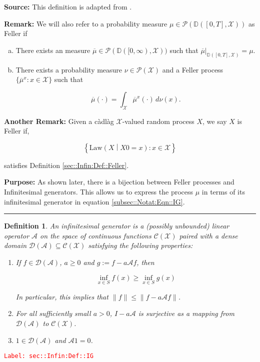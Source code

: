 \documentclass[12pt]{article}
\newcommand{\mb}{\mathbb}
\newcommand{\mc}{\mathcal}
\newcommand{\ov}{\overline}
\newcommand{\te}{\text}
\newcommand{\tr}{\textcolor{red}}
\newcommand{\labe}[1]{\tr{\texttt{Label: #1}}}
\newcommand{\purpose}{\textbf{Purpose: }}
\newcommand{\lin}{\rule{\linewidth}{0.4 pt}}
\newcommand{\cad}{\mb{D}}							%
\newcommand{\x}{x}								%
\newcommand{\X}{X}								%
\newcommand{\IG}{\mc{A}}						%
\newcommand{\law}{\te{Law}}						%
\newtheorem{defn}[thms]{Definition}
\begin{document}
\textbf{Source: } This definition is adapted from \cite[Definition 1.1,1.2]{Lig85}.

\textbf{Remark: } We will also refer to a probability measure \(\mu \in \mc{P}(\cad([0,T],\mc{X}))\) as Feller if

\begin{enumerate}[(a)]
\item There exists an measure \(\ov{\mu}\in \mc{P}(\cad([0,\infty),\mc{X}))\) such that \(\ov{\mu}|_{\cad([0,T],\mc{X})} = \mu\).

\item There exists a probability measure \(\nu\in \mc{P}(\mc{X})\) and a Feller process \(\{\ov{\mu}^x:x \in \mc{X}\}\) such that 

\[\ov{\mu}(\cdot) = \int_{\mc{X}} \ov{\mu}^x(\cdot)\,d\nu(x).\]
\end{enumerate}

\textbf{Another Remark: } Given a c\`adl\`ag \(\mc{X}\)-valued random process \(\X{}{}\), we say \(\X{}{}\) is Feller if,

\[\left\{\law\left(\X{}{}\middle|\X{}{0} = \x{}{}\right): \x{}{} \in \mc{X}\right\}\]

satisfies Definition \ref{sec::Infin:Def::Feller}.

\purpose As shown later, there is a bijection between Feller processes and Infinitesimal generators. This allows us to express the process \(\mu\) in terms of its infinitesimal generator in equation \eqref{subsec::Notat:Eqn::IG}.

\lin

\begin{defn}
An infinitesimal generator is a (possibly unbounded) linear operator \(\IG{}\) on the space of continuous functions \(\mc{C}(\mc{X})\) paired with a dense domain \(\mc{D}(\IG{}) \subseteq \mc{C}(\mc{X})\) satisfying the following properties:

\begin{enumerate}
\item If \(f \in \mc{D}(\IG{})\), \(a \geq 0\) and \(g:= f - a\IG{} f\), then 

\[\inf_{x \in S} f(x) \geq \inf_{x \in S} g(x)\]

\noindent In particular, this implies that \(\|f\| \leq \|f - a\IG{} f\|\).

\item For all sufficiently small \(a > 0\), \(I - a\IG{}\) is surjective as a mapping from \(\mc{D}(\IG{})\) to \(\mc{C}(\mc{X})\).

\item \(1 \in \mc{D}(\IG{})\) and \(\IG{} 1 = 0\).
\end{enumerate}
\label{sec::Infin:Def::IG}
\end{defn}
\labe{sec::Infin:Def::IG}
\end{document}

